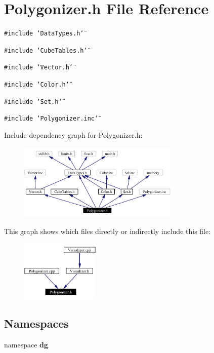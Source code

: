 \section{Polygonizer.h File Reference}
\label{Polygonizer_8h}
{\tt \#include \char`\"{}Data\-Types.h\char`\"{}}\par
{\tt \#include \char`\"{}Cube\-Tables.h\char`\"{}}\par
{\tt \#include \char`\"{}Vector.h\char`\"{}}\par
{\tt \#include \char`\"{}Color.h\char`\"{}}\par
{\tt \#include \char`\"{}Set.h\char`\"{}}\par
{\tt \#include \char`\"{}Polygonizer.inc\char`\"{}}\par


Include dependency graph for Polygonizer.h:\begin{figure}[H]
\begin{center}
\leavevmode
\includegraphics[width=217pt]{Polygonizer_8h__incl}
\end{center}
\end{figure}


This graph shows which files directly or indirectly include this file:\begin{figure}[H]
\begin{center}
\leavevmode
\includegraphics[width=106pt]{Polygonizer_8h__dep__incl}
\end{center}
\end{figure}
\subsection*{Namespaces}
\begin{CompactItemize}
\item 
namespace {\bf dg}
\end{CompactItemize}
